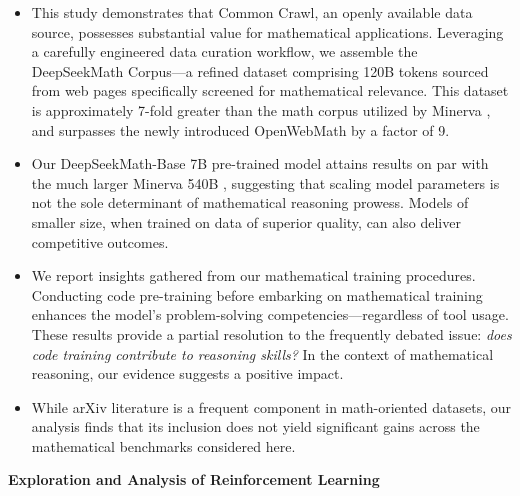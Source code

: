\begin{itemize}[topsep=0pt]
    \item This study demonstrates that Common Crawl, an openly available data source, possesses substantial value for mathematical applications. Leveraging a carefully engineered data curation workflow, we assemble the DeepSeekMath Corpus—a refined dataset comprising 120B tokens sourced from web pages specifically screened for mathematical relevance. This dataset is approximately 7-fold greater than the math corpus utilized by Minerva \citep{minerva}, and surpasses the newly introduced OpenWebMath \citep{openwebmath} by a factor of 9.

    \item Our DeepSeekMath-Base 7B pre-trained model attains results on par with the much larger Minerva 540B \citep{minerva}, suggesting that scaling model parameters is not the sole determinant of mathematical reasoning prowess. Models of smaller size, when trained on data of superior quality, can also deliver competitive outcomes.

    \item We report insights gathered from our mathematical training procedures. Conducting code pre-training before embarking on mathematical training enhances the model's problem-solving competencies—regardless of tool usage. These results provide a partial resolution to the frequently debated issue: \textit{does code training contribute to reasoning skills?} In the context of mathematical reasoning, our evidence suggests a positive impact.

    \item While arXiv literature is a frequent component in math-oriented datasets, our analysis finds that its inclusion does not yield significant gains across the mathematical benchmarks considered here.
\end{itemize}

\textbf{Exploration and Analysis of Reinforcement Learning}

